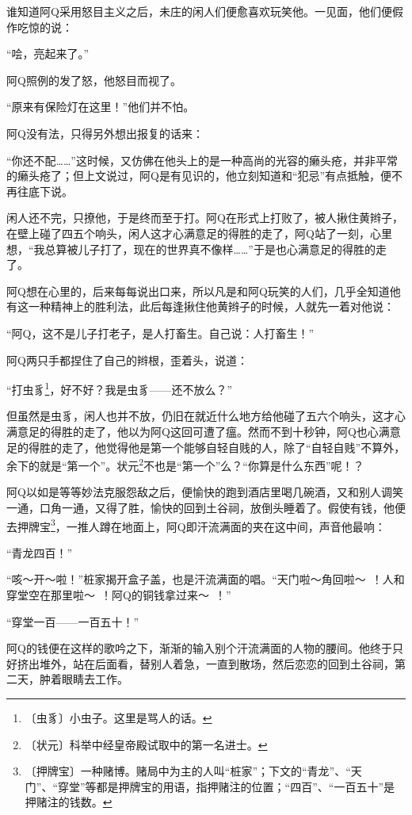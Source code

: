 \documentclass[12pt,UTF-8,openany]{ctexbook}
\begin{document}
\begin{normalsize}
    谁知道阿Q采用怒目主义之后，未庄的闲人们便愈喜欢玩笑他。一见面，他们便假作吃惊的说：
    
    “哙，亮起来了。”
    
    阿Q照例的发了怒，他怒目而视了。
    
    “原来有保险灯在这里！”他们并不怕。
    
    阿Q没有法，只得另外想出报复的话来：
    
    “你还不配……”这时候，又仿佛在他头上的是一种高尚的光容的癞头疮，并非平常的癞头疮了；但上文说过，阿Q是有见识的，他立刻知道和“犯忌”有点抵触，便不再往底下说。
    
    闲人还不完，只撩他，于是终而至于打。阿Q在形式上打败了，被人揪住黄辫子，在壁上碰了四五个响头，闲人这才心满意足的得胜的走了，阿Q站了一刻，心里想，“我总算被儿子打了，现在的世界真不像样……”于是也心满意足的得胜的走了。
    
    阿Q想在心里的，后来每每说出口来，所以凡是和阿Q玩笑的人们，几乎全知道他有这一种精神上的胜利法，此后每逢揪住他黄辫子的时候，人就先一着对他说：
    
    “阿Q，这不是儿子打老子，是人打畜生。自己说：人打畜生！”
    
    阿Q两只手都捏住了自己的辫根，歪着头，说道：
    
    “打虫豸\footnote{〔虫豸〕小虫子。这里是骂人的话。}，好不好？我是虫豸——还不放么？”
    
    但虽然是虫豸，闲人也并不放，仍旧在就近什么地方给他碰了五六个响头，这才心满意足的得胜的走了，他以为阿Q这回可遭了瘟。然而不到十秒钟，阿Q也心满意足的得胜的走了，他觉得他是第一个能够自轻自贱的人，除了“自轻自贱”不算外，余下的就是“第一个”。状元\footnote{〔状元〕科举中经皇帝殿试取中的第一名进士。}不也是“第一个”么？“你算是什么东西”呢！？
    
    阿Q以如是等等妙法克服怨敌之后，便愉快的跑到酒店里喝几碗酒，又和别人调笑一通，口角一通，又得了胜，愉快的回到土谷祠，放倒头睡着了。假使有钱，他便去押牌宝\footnote{〔押牌宝〕一种赌博。赌局中为主的人叫“桩家”；下文的“青龙”、“天门”、“穿堂”等都是押牌宝的用语，指押赌注的位置；“四百”、“一百五十”是押赌注的钱数。}，一推人蹲在地面上，阿Q即汗流满面的夹在这中间，声音他最响：
    
    “青龙四百！”
    
    “咳～开～啦！”桩家揭开盒子盖，也是汗流满面的唱。“天门啦～角回啦～~！人和穿堂空在那里啦～~！阿Q的铜钱拿过来～~！”
    
    “穿堂一百——一百五十！”
    
    阿Q的钱便在这样的歌吟之下，渐渐的输入别个汗流满面的人物的腰间。他终于只好挤出堆外，站在后面看，替别人着急，一直到散场，然后恋恋的回到土谷祠，第二天，肿着眼睛去工作。
    

\end{normalsize}
\end{document}
